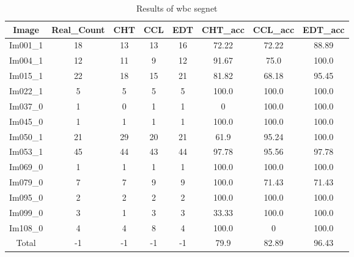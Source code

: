 \begin{table}[H]
\centering
\begin{tabular}{|c|c|c|c|c|c|c|c|}
\hline
 \textbf{Image} & \textbf{Real\_Count} & \textbf{CHT} & \textbf{CCL} & \textbf{EDT} & \textbf{CHT\_acc} & \textbf{CCL\_acc} & \textbf{EDT\_acc} \\ \hline
 Im001\_1 & 18 & 13 & 13 & 16 & 72.22 & 72.22 & 88.89 \\ 
 Im004\_1 & 12 & 11 & 9 & 12 & 91.67 & 75.0 & 100.0 \\ 
 Im015\_1 & 22 & 18 & 15 & 21 & 81.82 & 68.18 & 95.45 \\ 
 Im022\_1 & 5 & 5 & 5 & 5 & 100.0 & 100.0 & 100.0 \\ 
 Im037\_0 & 1 & 0 & 1 & 1 & 0 & 100.0 & 100.0 \\ 
 Im045\_0 & 1 & 1 & 1 & 1 & 100.0 & 100.0 & 100.0 \\ 
 Im050\_1 & 21 & 29 & 20 & 21 & 61.9 & 95.24 & 100.0 \\ 
 Im053\_1 & 45 & 44 & 43 & 44 & 97.78 & 95.56 & 97.78 \\ 
 Im069\_0 & 1 & 1 & 1 & 1 & 100.0 & 100.0 & 100.0 \\ 
 Im079\_0 & 7 & 7 & 9 & 9 & 100.0 & 71.43 & 71.43 \\ 
 Im095\_0 & 2 & 2 & 2 & 2 & 100.0 & 100.0 & 100.0 \\ 
 Im099\_0 & 3 & 1 & 3 & 3 & 33.33 & 100.0 & 100.0 \\ 
 Im108\_0 & 4 & 4 & 8 & 4 & 100.0 & 0 & 100.0 \\ \hline
 Total & -1 & -1 & -1 & -1 & 79.9 & 82.89 & 96.43 \\ 

\hline
\end{tabular}
\caption{Results of wbc segnet}
\label{Results of wbc segnet}
\end{table}
